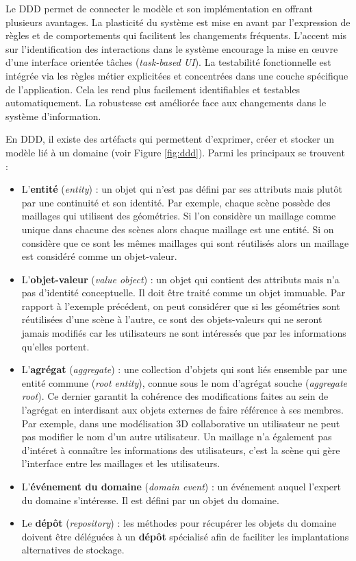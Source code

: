 Le \gls{DDD} permet de connecter le modèle et son implémentation en offrant 
plusieurs avantages. La plasticité du système est mise en avant par l'expression 
de règles et de comportements qui facilitent les changements fréquents.
L'accent mis sur l'identification des interactions dans le système encourage la 
mise en \oe{}uvre d'une interface orientée tâches (\textit{task-based UI}).
La testabilité fonctionnelle est intégrée via les règles métier explicitées 
et concentrées dans une couche spécifique de l'application. Cela les rend 
plus facilement identifiables et testables automatiquement.
La robustesse est améliorée face aux changements dans le système d'information.

En \gls{DDD}, il existe des artéfacts qui permettent d'exprimer, créer et stocker un 
modèle lié à un domaine (voir Figure \ref{fig:ddd}). Parmi les principaux se trouvent 
:
\begin{itemize}
	\item L'\textbf{entité} (\textit{entity}) : un objet qui n'est pas défini par ses 
	attributs mais plutôt par une continuité et son identité. 
	Par exemple, chaque scène possède des maillages qui utilisent des 
	géométries. Si l'on considère un maillage comme unique dans chacune des scènes alors chaque 
	maillage est une entité. Si on considère que ce sont les mêmes maillages qui 
	sont réutilisés alors un maillage est considéré comme un objet-valeur.
	
	\item L'\textbf{objet-valeur} (\textit{value object}) : un objet qui contient des 
	attributs mais n'a pas d'identité conceptuelle. Il doit être traité comme un objet
	immuable. Par rapport à l'exemple précédent, on peut considérer que si les 
	géométries sont réutilisées d'une scène à l'autre, ce sont des objets-valeurs qui 
	ne seront jamais modifiés car les utilisateurs ne sont intéressés que par les 
	informations qu'elles portent.
	
	\item L'\textbf{agrégat} (\textit{aggregate}) : une collection d'objets qui sont 
	liés ensemble par une entité commune (\textit{root entity}), connue sous le nom 
	d'agrégat souche (\textit{aggregate root}). Ce dernier garantit la cohérence des 
	modifications faites au sein de l'agrégat en interdisant aux objets externes de 
	faire référence à ses membres. Par exemple, dans une modélisation \gls{3D} 
	collaborative un utilisateur ne peut pas modifier le nom d'un autre utilisateur. Un 
	maillage n'a également pas d'intéret à connaître les informations des 
	utilisateurs, c'est la scène qui gère l'interface entre les maillages et les 
	utilisateurs.
	\item L'\textbf{événement du domaine} (\textit{domain event}) : un 
	événement auquel 
	l'expert du domaine s'intéresse. Il est défini par un objet du domaine.
	\item Le \textbf{dépôt} (\textit{repository}) : les méthodes pour récupérer les 
	objets du domaine doivent être déléguées à un \textbf{dépôt} spécialisé afin de 
	faciliter les implantations 
	alternatives de stockage.
\end{itemize}



